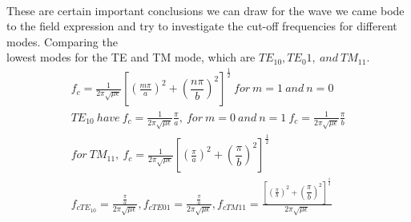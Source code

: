 	\paragraph{}These are certain important conclusions we can draw for the wave we came bode to the field expression and try to investigate the cut-off frequencies for different modes. Comparing the\\ lowest modes for the TE and TM mode, which are $TE_{10}, TE_{0}1,\ and\ TM_{11}$.
	\begin{align*}
	f_c = \frac{1}{2\pi \sqrt{\mu\epsilon}}[(\frac{m\pi}{a})^2 + (\dfrac{n\pi}{b})^2]^{\frac{1}{2}}\ for\ m=1\ and\ n=0\\
	TE_{10}\ have\ f_c = \frac{1}{2\pi \sqrt{\mu\epsilon}}\frac{\pi}{a},\ for\ m=0\ and\ n=1\ f_c = \frac{1}{2\pi \sqrt{\mu\epsilon}}\frac{\pi}{b}\\
	for\ TM_{11},\ f_c = \frac{1}{2\pi \sqrt{\mu\epsilon}}[(\frac{\pi}{a})^2 + (\dfrac{\pi}{b})^2]^{\frac{1}{2}}\\
	f_{cTE_{10}} = \frac{\frac{\pi}{a}}{2\pi \sqrt{\mu\epsilon}}, f_{cTE{01}} = \frac{\frac{\pi}{a}}{2\pi \sqrt{\mu\epsilon}}, f_{cTM{11}} = \frac{[(\frac{\pi}{b})^2 + (\dfrac{\pi}{b})^2]^{\frac{1}{2}}}{2\pi \sqrt{\mu\epsilon}}
	\end{align*}
